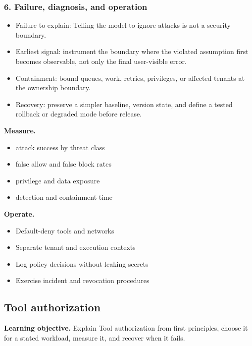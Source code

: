 \subsubsection*{6. Failure, diagnosis, and operation}
\begin{itemize}
\item Failure to explain: Telling the model to ignore attacks is not a security boundary.
\item Earliest signal: instrument the boundary where the violated assumption first becomes observable, not only the final user-visible error.
\item Containment: bound queues, work, retries, privileges, or affected tenants at the ownership boundary.
\item Recovery: preserve a simpler baseline, version state, and define a tested rollback or degraded mode before release.
\end{itemize}
\textbf{Measure.}\begin{itemize}
\item attack success by threat class
\item false allow and false block rates
\item privilege and data exposure
\item detection and containment time
\end{itemize}
\textbf{Operate.}\begin{itemize}
\item Default-deny tools and networks
\item Separate tenant and execution contexts
\item Log policy decisions without leaking secrets
\item Exercise incident and revocation procedures
\end{itemize}
\subsection{Tool authorization}
\textbf{Learning objective.} Explain Tool authorization from first principles, choose it for a stated workload, measure it, and recover when it fails.
